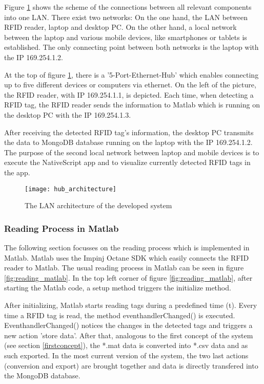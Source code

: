 Figure \ref{fig:hub_architecture} shows the scheme of the connections between all relevant components into one LAN. There exist two networks: On the one hand, the LAN between RFID reader, laptop and desktop PC. On the other hand, a local network between the laptop and various mobile devices, like smartphones or tablets is established. The only connecting point between both networks is the laptop with the IP 169.254.1.2.

At the top of figure \ref{fig:hub_architecture}, there is a '5-Port-Ethernet-Hub' which enables connecting up to five different devices or computers via ethernet. 
On the left of the picture, the RFID reader, with IP 169.254.1.1, is depicted. Each time, when detecting a RFID tag, the RFID reader sends the information to Matlab which is running on the desktop PC with the IP 169.254.1.3. 

After receiving the detected RFID tag's information, the desktop PC transmits the data to MongoDB database running on the laptop with the IP 169.254.1.2. 
The purpose of the second local network between laptop and mobile devices is to execute the NativeScript app and to visualize currently detected RFID tags in the app.

\begin{figure}
\centering
\texttt{[image: hub\_architecture]} 
\caption{\label{fig:hub_architecture}The LAN architecture of the developed system} 
\end{figure}

\subsubsection{Reading Process in Matlab}

The following section focusses on the reading process which is implemented in Matlab. Matlab uses the Impinj Octane SDK \cite{octanesdk} which easily connects the RFID reader to Matlab. The usual reading process in Matlab can be seen in figure \ref{fig:reading_matlab}. In the top left corner of figure \ref{fig:reading_matlab}, after starting the Matlab code, a setup method triggers the initialize method. 

After initializing, Matlab starts reading tags during a predefined time (t). Every time a RFID tag is read, the method eventhandlerChanged() is executed. EventhandlerChanged() notices the changes in the detected tags and triggers a new action 'store data'. After that, analogous to the first concept of the system (see section \ref{firstconcept}), the *.mat data is converted into *.csv data and as such exported. In the most current version of the system, the two last actions (conversion and export) are brought together and data is directly transfered into the MongoDB database. 

